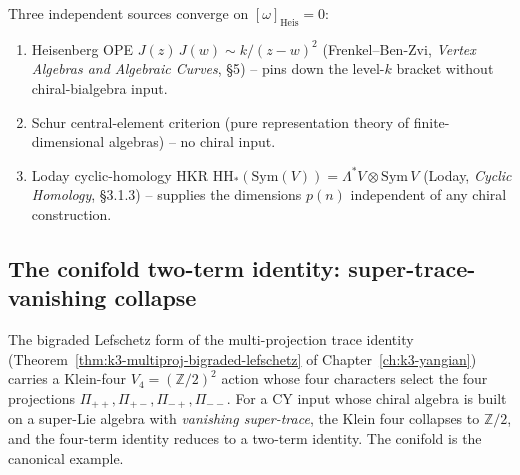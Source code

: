 \begin{remark}[Three disjoint sources for \texorpdfstring{$\omega = 0$}{omega = 0}]
\label{rem:heisenberg-pentagon-IV}
Three independent sources converge on $[\omega]_{\mathrm{Heis}} = 0$:
\begin{enumerate}
\item Heisenberg OPE
 $J(z)\,J(w) \sim k/(z - w)^2$
 \textup{(}Frenkel--Ben-Zvi, \emph{Vertex Algebras and Algebraic
 Curves}, \S5\textup{)} -- pins down the level-$k$ bracket
 without chiral-bialgebra input.
\item Schur central-element criterion (pure representation theory of
 finite-dimensional algebras) -- no chiral input.
\item Loday cyclic-homology HKR
 $\mathrm{HH}_*(\mathrm{Sym}(V)) = \Lambda^* V \otimes
 \mathrm{Sym}\, V$
 \textup{(}Loday, \emph{Cyclic Homology}, \S3.1.3\textup{)} --
 supplies the dimensions $p(n)$ independent of any chiral
 construction.
\end{enumerate}
\end{remark}

\subsection{The conifold two-term identity:
super-trace-vanishing collapse}
\label{subsec:conifold-two-term}

The bigraded Lefschetz form of the multi-projection trace identity
\textup{(}Theorem~\ref{thm:k3-multiproj-bigraded-lefschetz} of
Chapter~\ref{ch:k3-yangian}\textup{)} carries a Klein-four
$V_4 = (\mathbb{Z}/2)^2$ action whose four characters select the four
projections $\Pi_{++}, \Pi_{+-}, \Pi_{-+}, \Pi_{--}$. For a CY
input whose chiral algebra is built on a super-Lie algebra with
\emph{vanishing super-trace}, the Klein four collapses to
$\mathbb{Z}/2$, and the four-term identity reduces to a two-term
identity. The conifold is the canonical example.

